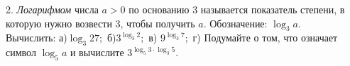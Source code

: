 2. {\it Логарифмом} числа $a>0$ по основанию 3 называется показатель степени, в которую нужно возвести 3, чтобы получить $a.$ Обозначение: $\log_3 a.$\\
Вычислить: а)$\log_3 27;$ б)$3^{\log_3 2};$ в) $9^{\log_3 7};$ г) Подумайте о том, что означает символ $\log_5 a$ и вычислите $3^{\log_5 3\cdot\log_3 5}.$\\
